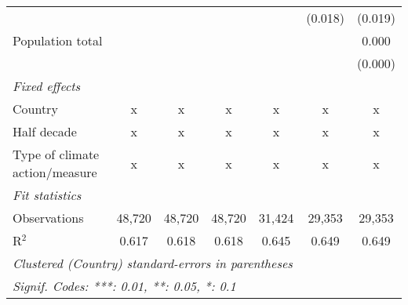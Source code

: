 \begin{tabular}{lcccccc}
                                                                                      &                &                &                &                & (0.018)        & (0.019)\\   
   Population total                                                                   &                &                &                &                &                & 0.000\\   
                                                                                      &                &                &                &                &                & (0.000)\\   
   \emph{Fixed effects}\\
   Country                                                                            & x              & x              & x              & x              & x              & x\\  
   Half decade                                                                        & x              & x              & x              & x              & x              & x\\  
   Type of climate action/measure                                                     & x              & x              & x              & x              & x              & x\\  
   \midrule \emph{Fit statistics}\\
   Observations                                                                       & 48,720         & 48,720         & 48,720         & 31,424         & 29,353         & 29,353\\  
   R$^2$                                                                              & 0.617          & 0.618          & 0.618          & 0.645          & 0.649          & 0.649\\  
   \midrule
   \multicolumn{7}{l}{\emph{Clustered (Country) standard-errors in parentheses}}\\
   \multicolumn{7}{l}{\emph{Signif. Codes: ***: 0.01, **: 0.05, *: 0.1}}\\
\end{tabular}
\par\endgroup


